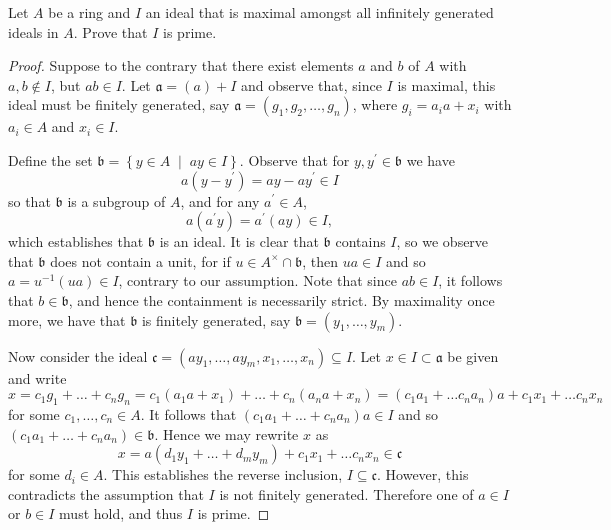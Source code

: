 \documentclass[10pt]{amsart}
\begin{document}
\begin{thm}
  Let $A$ be a ring and $I$ an ideal that is maximal amongst all infinitely generated ideals in $A$.  Prove that $I$ is prime.
  
  \begin{proof}
    Suppose to the contrary that there exist elements $a$ and $b$ of $A$ with $a,b \not \in I$, but $ab \in I$.
    Let $\mathfrak{a} = (a) + I$ and observe that, since $I$ is maximal, this ideal must be finitely generated, say $\mathfrak{a} = (g_1, g_2, \ldots, g_n)$, where $g_i = a_ia + x_i$ with $a_i \in A$ and $x_i \in I$.
    
    Define the set $\mathfrak{b} = \left\{ y \in A \;\middle\vert\; ay \in I \right\}$.
    Observe that for $y, y^\prime \in \mathfrak{b}$ we have 
    $$a(y - y^\prime) = ay - ay^\prime \in I$$ 
    so that $\mathfrak{b}$ is a subgroup of $A$, and for any $a^\prime \in A$, 
    $$a(a^\prime y) = a^\prime(ay) \in I,$$
    which establishes that $\mathfrak{b}$ is an ideal.
    It is clear that $\mathfrak{b}$ contains $I$, so we observe that $\mathfrak{b}$ does not contain a unit, for if $u \in A^\times \cap \mathfrak{b}$, then $ua \in I$ and so $a = u^{-1}(ua) \in I$, contrary to our assumption.
    Note that since $ab \in I$, it follows that $b \in \mathfrak{b}$, and hence the containment is necessarily strict.
    By maximality once more, we have that $\mathfrak{b}$ is finitely generated, say $\mathfrak{b} = (y_1, \ldots, y_m)$.
    
    Now consider the ideal $\mathfrak{c} = (ay_1, \ldots, ay_m, x_1, \ldots, x_n) \subseteq I$.
    Let $x \in I \subset \mathfrak{a}$ be given and write 
    $$x = c_1g_1 + \ldots + c_ng_n  = c_1(a_1a + x_1) + \ldots + c_n(a_na + x_n) = (c_1a_1 + \ldots c_na_n)a + c_1x_1 + \ldots c_nx_n$$%
    for some $c_1, \ldots, c_n \in A$.
    It follows that $(c_1a_1 + \ldots + c_na_n)a \in I$ and so $(c_1a_1 + \ldots + c_na_n) \in \mathfrak{b}$.
    Hence we may rewrite $x$ as 
    $$x = a(d_1y_1 + \ldots + d_my_m) + c_1x_1 + \ldots c_nx_n \in \mathfrak{c}$$
    for some $d_i \in A$.
    This establishes the reverse inclusion, $I \subseteq \mathfrak{c}$.
    However, this contradicts the assumption that $I$ is not finitely generated.
    Therefore one of $a \in I$ or $b \in I$ must hold, and thus $I$ is prime.
  \end{proof}
\end{thm}
\end{document}
